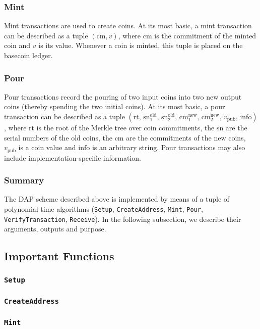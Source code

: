 \documentclass{article}
\begin{document}
\subsubsection{Mint}
Mint transactions are used to create coins. At its most basic, a mint transaction can be described as a tuple $(\text{cm}, v)$, where $\text{cm}$ is the commitment of the minted coin and $v$ is its value. Whenever a coin is minted, this tuple is placed on the basecoin ledger.

\subsubsection{Pour}
Pour transactions record the pouring of two input coins into two new output coins (thereby spending the two initial coins). At its most basic, a pour transaction can be described as a tuple $(\text{rt}, \, {\text{sn}}^{\text{old}}_1, \, {\text{sn}}^{\text{old}}_2, \, {\text{cm}}^{\text{new}}_1, \, {\text{cm}}^{\text{new}}_2, \, v_{\text{pub}}, \, \text{info})$, where rt is the root of the Merkle tree over coin commitments, the sn are the serial numbers of the old coins, the cm are the commitments of the new coins, $v_{\text{pub}}$ is a coin value and info is an arbitrary string. Pour transactions may also include implementation-specific information.

\subsubsection{Summary}

The DAP scheme described above is implemented by means of a tuple of polynomial-time algorithms (\texttt{Setup}, \texttt{CreateAddress}, \texttt{Mint}, \texttt{Pour}, \texttt{VerifyTransaction}, \texttt{Receive}). In the following subsection, we describe their arguments, outputs and purpose.

\subsection{Important Functions}
\subsubsection{\texttt{Setup}}
\subsubsection{\texttt{CreateAddress}}
\subsubsection{\texttt{Mint}}
\end{document}
